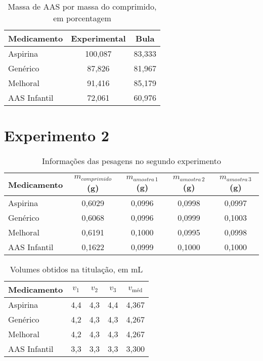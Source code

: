 \begin{table}[H]\label{porcentagem1}
    \centering
    \begin{tabular}{l c c}
        \toprule
        Medicamento & Experimental & Bula \\
        \midrule
        Aspirina\R     & 100,087 & 83,333 \\
        Genérico     & 87,826  & 81,967 \\
        Melhoral     & 91,416  & 85,179 \\
        AAS Infantil & 72,061  & 60,976 \\
        \bottomrule
    \end{tabular}
    \caption{Massa de AAS por massa do comprimido, em porcentagem}
\end{table}

\section{Experimento 2}\label{res_exp2}

\begin{table}[H]\label{t:peso_2}
    \centering
    \begin{tabular}{l c c c c}
       \toprule
       Medicamento & $m_{comprimido}$ (g) &$m_{amostra \, 1}$ (g) &
       $m_{amostra \, 2}$ (g) & $m_{amostra\, 3}$ (g)\\
       \midrule
       Aspirina\R     & 0,6029 & 0,0996 & 0,0998 & 0,0997  \\
       Genérico     & 0,6068 & 0,0996 & 0,0999 & 0,1003  \\
       Melhoral     & 0,6191 & 0,1000 & 0,0995 & 0,0998 \\
       AAS Infantil & 0,1622 & 0,0999 & 0,1000 & 0,1000 \\
        \bottomrule
    \end{tabular}
    \caption{Informações das pesagens no segundo experimento}
\end{table}

\begin{table}[H]\label{titulacao_exp2}
    \centering
    \begin{tabular}{l c c c c}

        \toprule
        Medicamento & $v_1$  & $v_2$ & $v_3$ &  $v_{\textrm{méd}}$ \\
        \midrule
        Aspirina\R   & 4,4 & 4,3 & 4,4 & 4,367 \\
        Genérico     & 4,2 & 4,3 & 4,3 & 4,267 \\
        Melhoral     & 4,2 & 4,3 & 4,3 & 4,267 \\
        AAS Infantil & 3,3 & 3,3 & 3,3 & 3,300 \\
       \bottomrule

    \end{tabular}
    \caption{Volumes obtidos na titulação, em mL}
\end{table}

